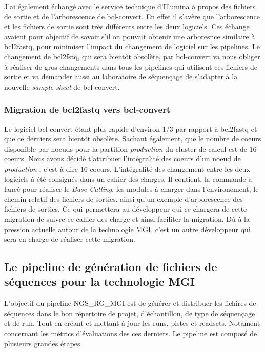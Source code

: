 J'ai également échangé avec le service technique d'Illumina à propos des fichiers de sortie et de l'arborescence de bcl-convert. En effet il s'avère que l'arborescence et les fichiers de sortie sont très différents entre les deux logiciels. Ces échange avaient pour objectif de savoir s'il on pouvait obtenir une arboresnce similaire à bcl2fastq, pour minimiser l'impact du changement de logiciel sur les pipelines. Le changement de bcl2fstq, qui sera bientôt obsolète, par bcl-convert va nous obliger à réaliser de gros changements dans tous les pipelines qui utilisent ces fichiers de sortie et va demander aussi au laboratoire de séquençage de s'adapter à la nouvelle \emph{sample sheet} de bcl-convert.

\subsubsection{Migration de bcl2fastq vers bcl-convert}
Le logiciel bcl-convert étant plus rapide d'environ 1/3 par rapport à bcl2fastq et que ce derniers sera bientôt obsolète. Sachant également, que le nombre de coeurs disponible par noeuds pour la partition \og \emph{production} \fg{}du cluster de calcul est de 16 coeurs. Nous avons décidé t'attribuer l'intégralité des coeurs d'un noeud de \og\emph{production} \fg{}, c'est à dire 16 coeurs. L'intégralité des changement entre les deux logiciels à été consignés dans un cahier des charges. Il contient, la commande à lancé pour réaliser le \emph{Base Calling}, les modules à charger dans l'environement, le chemin relatif des fichiers de sorties, ainsi qu'un exemple d'arborescence des fichiers de sorties. Ce qui permettera au développeur qui ce chargera de cette migration de suivre ce cahier des charge et ainsi faciliter la migration. Dû à la pression actuelle autour de la technologie MGI, c'est un autre développeur qui sera en charge de réaliser cette migration.


\subsection{Le pipeline de génération de fichiers de séquences pour la technologie MGI}
L'objectif du pipeline NGS\_RG\_MGI est de générer et distribuer les fichires de séquences dans le bon répertoire de projet, d'échantillon, de type de séquençage et de run.
Tout en créant et mettant à jour les runs, pistes et readsets.
Notament concernant les métrics d'évaluations des ces derniers.
Le pipeline est composé de plusieurs grandes étapes.\\

